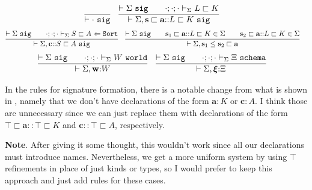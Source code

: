 \documentclass[letterpaper, 11pt]{article}
\newcommand{\mlcomment}[1]{} %
\newcommand{\Lar}{\Leftarrow}
\newcommand{\Sort}{\texttt{Sort}}
\newcommand{\world}{\texttt{world}}
\newcommand{\schema}{\texttt{schema}}
\newcommand{\sctx}{\texttt{sctx}}
\newcommand{\sig}{\texttt{sig}}
\begin{document}
    \begin{align*}
        & \infer{\vdash \cdot \ \sig}{} &
        & \infer{\vdash \Sigma, \textbf{s} \sqsubset \textbf{a} {::} L \sqsubset K \ \sig}
          {
            \vdash \Sigma \ \sig
            &&
            \cdot ; \cdot ; \cdot \vdash_\Sigma L \sqsubset K
          }
    \end{align*}
    \begin{align*}
        & \infer{\vdash \Sigma, \textbf{c} {::} S \sqsubset A \ \sig}
          {
            \vdash \Sigma \ \sig
            &&
            \cdot ; \cdot ; \cdot \vdash_\Sigma S \sqsubset A \Lar \Sort
          } &
        & \infer{\vdash \Sigma, \textbf{s}_1 \leq \textbf{s}_2 \sqsubset \textbf{a}}
          {
            \vdash \Sigma \ \sig
            &&
            \textbf{s}_1 \sqsubset \textbf{a} {::} L \sqsubset K \in \Sigma
            &&
            \textbf{s}_2 \sqsubset \textbf{a} {::} L \sqsubset K \in \Sigma
          }
    \end{align*}
    \begin{align*}
        & \infer{\vdash \Sigma , \textbf{w} {:} W}
          {
            \vdash \Sigma \ \sig
            &&
            \cdot ; \cdot ; \cdot \vdash_\Sigma W \ \world
          } &
        & \infer{\vdash \Sigma , \boldsymbol{\xi} {:} \Xi}
          {
            \vdash \Sigma \ \sig
            &&
            \cdot ; \cdot ; \cdot \vdash_\Sigma \Xi \ \schema
          } &
    \end{align*}

    In the rules for signature formation, there is a notable change from what is shown in \cite{LovasPfenning2010}, namely that we don't have
    declarations of the form $\textbf{a} {:} K$ or $\textbf{c} : A$.  I think those are unnecessary since we can just replace them with declarations
    of the form $\top \sqsubset \textbf{a} {::} \top \sqsubset K$ and $\textbf{c} {::} \top \sqsubset A$, respectively.

    \textbf{Note}.  After giving it some thought, this wouldn't work since all our declarations must introduce names.  Nevertheless, we get a more
    uniform system by using $\top$ refinements in place of just kinds or types, so I would prefer to keep this approach and just add rules for
    these cases.

\mlcomment{
    $\boxed{\vdash_\Sigma \Omega \ \sctx}$

    \begin{align*}
      & \infer{\vdash \cdot \ \sctx}{} &
      & \infer{\vdash \Omega, \psi {:} \Xi \ \sctx}
        {
          \vdash \Omega \ \sctx
          &&
          \boldsymbol{\xi} {:} \Xi \in \Sigma
        }
    \end{align*}

    \textbf{Remark}.  Maybe the names $\boldsymbol{\xi}$ are unnecessary in the signature.
}
\end{document}

